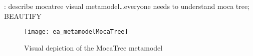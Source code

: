 \newpage

\update : describe mocatree visual metamodel\ldots everyone needs to understand moca tree; BEAUTIFY

\begin{figure}[htbp]
  \hspace{-3cm}
  \texttt{[image: ea\_metamodelMocaTree]}
  \caption{Visual depiction of the MocaTree metamodel}
  \label{mocaTreeMetamodel}
\end{figure}


\newpage






